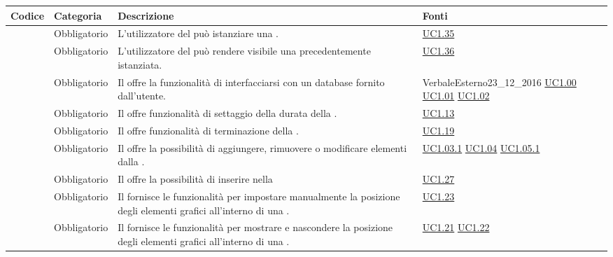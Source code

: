 \begin{longtable}{|P{1.5cm}|P{2.5cm}|P{6.5cm}|P{2.5cm}|}
	\hline \textbf{Codice} & \textbf{Categoria} & \textbf{Descrizione} & \textbf{Fonti} \\
	\hline \RequisitoObF\label{L6} & Obbligatorio & L'utilizzatore del  può istanziare una . & \hyperref[UC1.35]{UC1.35} \\
	\hline \RequisitoObF\label{L7} & Obbligatorio & L'utilizzatore del  può rendere visibile una  precedentemente istanziata. & \hyperref[UC1.36]{UC1.36} \\
	\hline \RequisitoObF\label{L8} & Obbligatorio & Il  offre la funzionalità di interfacciarsi con un database  fornito dall'utente. & VerbaleEsterno23\_12\_2016 \linebreak \hyperref[UC1.00]{UC1.00} \linebreak \hyperref[UC1.01]{UC1.01} \hyperref[UC1.02]{UC1.02} \\
	\hline \RequisitoObF\label{L9} & Obbligatorio & Il  offre funzionalità di settaggio della durata della . & \hyperref[UC1.13]{UC1.13} \\
	\hline \RequisitoObF\label{L10} & Obbligatorio & Il  offre funzionalità di terminazione della . & \hyperref[UC1.19]{UC1.19} \\
	\hline \RequisitoObF\label{L11} & Obbligatorio & Il  offre la possibilità di aggiungere, rimuovere o modificare elementi dalla . & \hyperref[UC1.03.1]{UC1.03.1} \hyperref[UC1.04]{UC1.04} \hyperref[UC1.05.1]{UC1.05.1} \\
	\hline \RequisitoObF\label{L12} & Obbligatorio & Il  offre la possibilità di inserire  nella  & \hyperref[UC1.27]{UC1.27} \\
	\hline \RequisitoObF\label{L13} & Obbligatorio & Il  fornisce le funzionalità per impostare manualmente la posizione degli elementi grafici all'interno di una . & \hyperref[UC1.23]{UC1.23} \\
	\hline \RequisitoObF\label{L14} & Obbligatorio & Il  fornisce le funzionalità per mostrare e nascondere la posizione degli elementi grafici all'interno di una . & \hyperref[UC1.21]{UC1.21} \linebreak \hyperref[UC1.22]{UC1.22} \\

\end{longtable}
